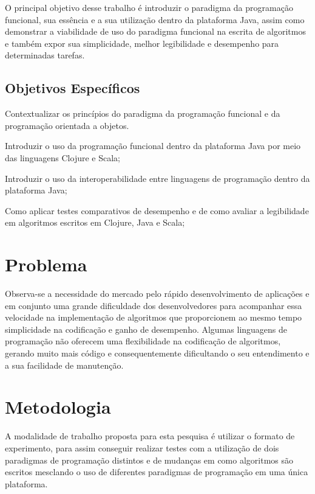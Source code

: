    O principal objetivo desse trabalho é introduzir o paradigma da programação funcional, sua essência e a sua utilização dentro da plataforma Java, assim como demonstrar a viabilidade de uso do paradigma funcional na escrita de algoritmos e também expor sua simplicidade, melhor legibilidade e desempenho para determinadas tarefas.

  \subsection{Objetivos Específicos}

    \begin{compactitem}
      \item Contextualizar os princípios do paradigma da programação funcional e da programação orientada a objetos.
      \item Introduzir o uso da programação funcional dentro da plataforma Java por meio das linguagens Clojure e Scala;
      \item Introduzir o uso da interoperabilidade entre linguagens de programação dentro da plataforma Java;
      \item Como aplicar testes comparativos de desempenho e de como avaliar a legibilidade em algoritmos escritos em Clojure, Java e Scala;
    \end{compactitem}

\section{Problema}

  Observa-se a necessidade do mercado pelo rápido desenvolvimento de aplicações e em conjunto uma grande dificuldade dos desenvolvedores para acompanhar essa velocidade na implementação de algoritmos que proporcionem ao mesmo tempo simplicidade na codificação e ganho de desempenho. Algumas linguagens de programação não oferecem uma flexibilidade na codificação de algoritmos, gerando muito mais código e consequentemente dificultando o seu entendimento e a sua facilidade de manutenção.

\section{Metodologia}

  A modalidade de trabalho proposta para esta pesquisa é utilizar o formato de experimento, para assim conseguir realizar testes com a utilização de dois paradigmas de programação distintos e de mudanças em como algoritmos são escritos mesclando o uso de diferentes paradigmas de programação em uma única plataforma.

